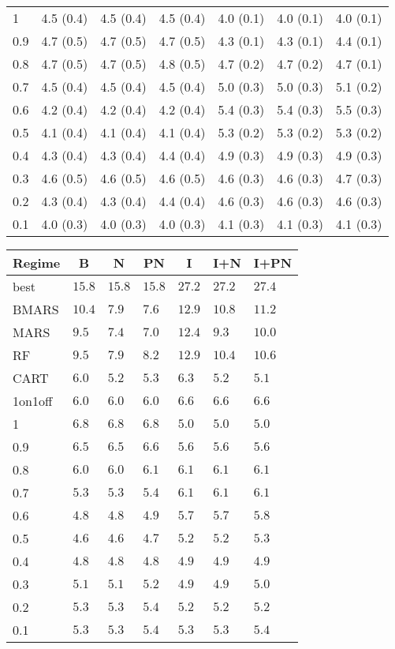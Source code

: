 \documentclass[12pt]{article}
\begin{document}
\begin{table}[!tbp]
\begin{center}
\begin{tabular}{lllllll}
1&4.5 (0.4)&4.5 (0.4)&4.5 (0.4)&4.0 (0.1)&4.0 (0.1)&4.0 (0.1)\tabularnewline
0.9&4.7 (0.5)&4.7 (0.5)&4.7 (0.5)&4.3 (0.1)&4.3 (0.1)&4.4 (0.1)\tabularnewline
0.8&4.7 (0.5)&4.7 (0.5)&4.8 (0.5)&4.7 (0.2)&4.7 (0.2)&4.7 (0.1)\tabularnewline
0.7&4.5 (0.4)&4.5 (0.4)&4.5 (0.4)&5.0 (0.3)&5.0 (0.3)&5.1 (0.2)\tabularnewline
0.6&4.2 (0.4)&4.2 (0.4)&4.2 (0.4)&5.4 (0.3)&5.4 (0.3)&5.5 (0.3)\tabularnewline
0.5&4.1 (0.4)&4.1 (0.4)&4.1 (0.4)&5.3 (0.2)&5.3 (0.2)&5.3 (0.2)\tabularnewline
0.4&4.3 (0.4)&4.3 (0.4)&4.4 (0.4)&4.9 (0.3)&4.9 (0.3)&4.9 (0.3)\tabularnewline
0.3&4.6 (0.5)&4.6 (0.5)&4.6 (0.5)&4.6 (0.3)&4.6 (0.3)&4.7 (0.3)\tabularnewline
0.2&4.3 (0.4)&4.3 (0.4)&4.4 (0.4)&4.6 (0.3)&4.6 (0.3)&4.6 (0.3)\tabularnewline
0.1&4.0 (0.3)&4.0 (0.3)&4.0 (0.3)&4.1 (0.3)&4.1 (0.3)&4.1 (0.3)\tabularnewline
\bottomrule
\end{tabular}\end{center}
\end{table}


\begin{table}[!tbp]
\begin{center}
\begin{tabular}{lllllll}
\toprule
\multicolumn{1}{c}{Regime}&\multicolumn{1}{c}{B}&\multicolumn{1}{c}{N}&\multicolumn{1}{c}{PN}&\multicolumn{1}{c}{I}&\multicolumn{1}{c}{I+N}&\multicolumn{1}{c}{I+PN}\tabularnewline
\midrule
best&$15.8$&$15.8$&$15.8$&$27.2$&$27.2$&$27.4$\tabularnewline
BMARS&$10.4$&$7.9$&$ 7.6$&$12.9$&$10.8$&$11.2$\tabularnewline
MARS&$ 9.5$&$7.4$&$ 7.0$&$12.4$&$ 9.3$&$10.0$\tabularnewline
RF&$ 9.5$&$7.9$&$ 8.2$&$12.9$&$10.4$&$10.6$\tabularnewline
CART&$ 6.0$&$5.2$&$ 5.3$&$ 6.3$&$ 5.2$&$ 5.1$\tabularnewline
1on1off&$ 6.0$&$6.0$&$ 6.0$&$ 6.6$&$ 6.6$&$ 6.6$\tabularnewline
1&$ 6.8$&$6.8$&$ 6.8$&$ 5.0$&$ 5.0$&$ 5.0$\tabularnewline
0.9&$ 6.5$&$6.5$&$ 6.6$&$ 5.6$&$ 5.6$&$ 5.6$\tabularnewline
0.8&$ 6.0$&$6.0$&$ 6.1$&$ 6.1$&$ 6.1$&$ 6.1$\tabularnewline
0.7&$ 5.3$&$5.3$&$ 5.4$&$ 6.1$&$ 6.1$&$ 6.1$\tabularnewline
0.6&$ 4.8$&$4.8$&$ 4.9$&$ 5.7$&$ 5.7$&$ 5.8$\tabularnewline
0.5&$ 4.6$&$4.6$&$ 4.7$&$ 5.2$&$ 5.2$&$ 5.3$\tabularnewline
0.4&$ 4.8$&$4.8$&$ 4.8$&$ 4.9$&$ 4.9$&$ 4.9$\tabularnewline
0.3&$ 5.1$&$5.1$&$ 5.2$&$ 4.9$&$ 4.9$&$ 5.0$\tabularnewline
0.2&$ 5.3$&$5.3$&$ 5.4$&$ 5.2$&$ 5.2$&$ 5.2$\tabularnewline
0.1&$ 5.3$&$5.3$&$ 5.4$&$ 5.3$&$ 5.3$&$ 5.4$\tabularnewline
\bottomrule
\end{tabular}\end{center}
\end{table}
\end{document}
